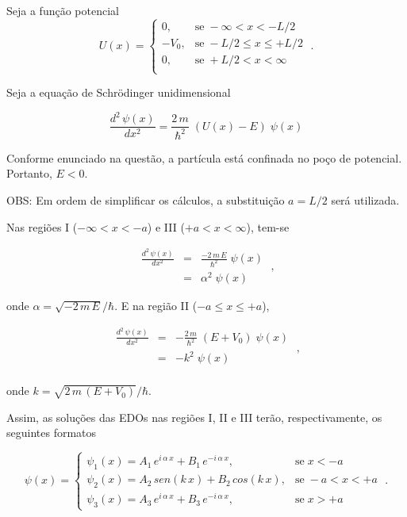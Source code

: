 Seja a função potencial
\begin{equation}
	U(x) =
	\begin{cases}
		0,    & \mbox{se}\; -\infty<x<-L/2      \\
		-V_0, & \mbox{se}\; -L/2 \le x \le +L/2 \\
		0,    & \mbox{se}\; +L/2<x<\infty       \\
	\end{cases}\;.
\end{equation}

Seja a equação de Schrödinger unidimensional

\begin{equation}
	\frac{d^2\,\psi(x)}{dx^2} = \frac{2\,m}{\hbar^2}\;(U(x)-E)\;\psi(x)
\end{equation}

\noindent Conforme enunciado na questão, a partícula está confinada no poço de
potencial. Portanto, $E<0$.

OBS: Em ordem de simplificar os cálculos, a substituição $a=L/2$ será
utilizada.

Nas regiões I ($-\infty<x<-a$) e III ($+a<x<\infty$), tem-se

\begin{equation}
	\begin{array}{lcl}
		\frac{d^2\,\psi(x)}{dx^2} & = & \frac{-2\,m\,E}{\hbar^2}\;\psi(x) \\
		                          & = & \alpha^{2}\;\psi(x)
	\end{array}\;,
\end{equation}

\noindent onde $\alpha = \sqrt{-2\,m\,E}/\hbar$. E na região II ($-a \le x \le
	+a$),

\begin{equation}
	\begin{array}{lcl}
		\frac{d^2\,\psi(x)}{dx^2} & = & -\frac{2\,m}{\hbar^2}\;(E+V_0)\;\psi(x) \\
		                          & = & -k^{2}\;\psi(x)                         \\
	\end{array}\;,
\end{equation}

\noindent onde $k = \sqrt{2\,m\,(E+V_0)}/\hbar$.

Assim, as soluções das EDOs nas regiões I, II e III terão, respectivamente, os
seguintes formatos

\begin{equation}
	\psi(x) =
	\begin{cases}
		\psi_{1}(x) = A_1\,e^{i\,\alpha\,x} + B_1\,e^{-i\,\alpha\,x},
		 & \mbox{se}\;x<-a    \\
		\psi_{2}(x) = A_2\,sen(k\,x) + B_2\,cos(k\,x),
		 & \mbox{se}\;-a<x<+a \\
		\psi_{3}(x) = A_3\,e^{i\,\alpha\,x} + B_3\,e^{-i\,\alpha\,x},
		 & \mbox{se}\;x>+a
	\end{cases}\;.
\end{equation}

